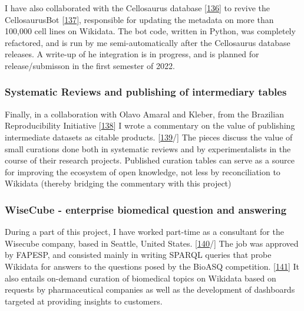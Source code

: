 I have also collaborated with the Cellosaurus database {[}\protect\hyperlink{ref-1DguATd9G}{136}{]} to revive the CellosaurusBot {[}\protect\hyperlink{ref-lMQxhx3q}{137}{]}, responsible for updating the metadata on more than 100,000 cell lines on Wikidata. The bot code, written in Python, was completely refactored, and is run by me semi-automatically after the Cellosaurus database releases. A write-up of he integration is in progress, and is planned for release/submisson in the first semester of 2022.

\hypertarget{systematic-reviews-and-publishing-of-intermediary-tables}{%
\subsubsection{Systematic Reviews and publishing of intermediary tables}\label{systematic-reviews-and-publishing-of-intermediary-tables}}

Finally, in a collaboration with Olavo Amaral and Kleber, from the Brazilian Reproducibility Initiative {[}\protect\hyperlink{ref-F2mYjDJ0}{138}{]} I wrote a commentary on the value of publishing intermediate datasets as citable products. {[}\protect\hyperlink{ref-HbZ13t8l}{139}/{]}
The pieces discuss the value of small curations done both in systematic reviews and by experimentalists in the course of their research projects. Published curation tables can serve as a source for improving the ecosystem of open knowledge, not less by reconciliation to Wikidata (thereby bridging the commentary with this project)

\hypertarget{wisecube---enterprise-biomedical-question-and-answering}{%
\subsubsection{WiseCube - enterprise biomedical question and answering}\label{wisecube---enterprise-biomedical-question-and-answering}}

During a part of this project, I have worked part-time as a consultant for the Wisecube company, based in Seattle, United States. {[}\protect\hyperlink{ref-gdYsBE7d}{140}/{]}
The job was approved by FAPESP, and consisted mainly in writing SPARQL queries that probe Wikidata for answers to the questions posed by the BioASQ competition. {[}\protect\hyperlink{ref-rkXotO9x}{141}{]}
It also entails on-demand curation of biomedical topics on Wikidata based on requests by pharmaceutical companies as well as the development of dashboards targeted at providing insights to customers.

